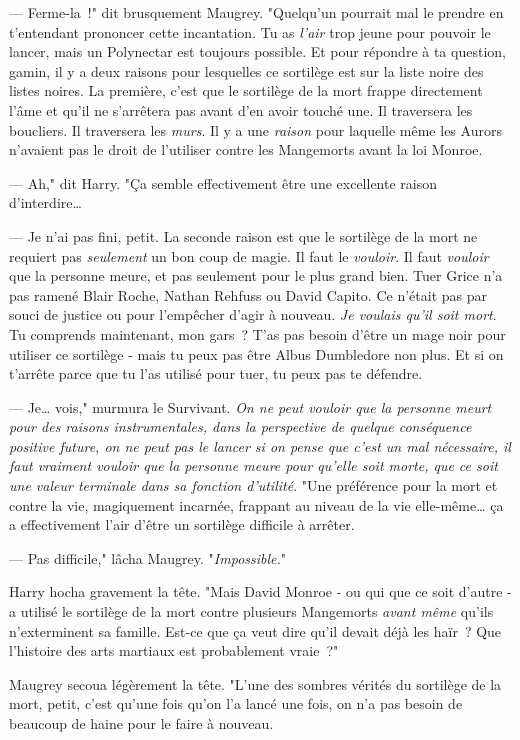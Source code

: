 --- Ferme-la~!" dit brusquement Maugrey. "Quelqu'un pourrait mal le prendre en t'entendant prononcer cette incantation. Tu as \emph{l'air} trop jeune pour pouvoir le lancer, mais un Polynectar est toujours possible. Et pour répondre à ta question, gamin, il y a deux raisons pour lesquelles ce sortilège est sur la liste noire des listes noires. La première, c'est que le sortilège de la mort frappe directement l'âme et qu'il ne s'arrêtera pas avant d'en avoir touché une. Il traversera les boucliers. Il traversera les \emph{murs}. Il y a une \emph{raison} pour laquelle même les Aurors n'avaient pas le droit de l'utiliser contre les Mangemorts avant la loi Monroe.

--- Ah," dit Harry. "Ça semble effectivement être une excellente raison d'interdire…

--- Je n'ai pas fini, petit. La seconde raison est que le sortilège de la mort ne requiert pas \emph{seulement} un bon coup de magie. Il faut le \emph{vouloir}. Il faut \emph{vouloir} que la personne meure, et pas seulement pour le plus grand bien. Tuer Grice n'a pas ramené Blair Roche, Nathan Rehfuss ou David Capito. Ce n'était pas par souci de justice ou pour l'empêcher d'agir à nouveau. \emph{Je voulais qu'il soit mort}. Tu comprends maintenant, mon gars~? T'as pas besoin d'être un mage noir pour utiliser ce sortilège - mais tu peux pas être Albus Dumbledore non plus. Et si on t'arrête parce que tu l'as utilisé pour tuer, tu peux pas te défendre.

--- Je… vois," murmura le Survivant. \emph{On ne peut vouloir que la personne meurt pour des raisons instrumentales, dans la perspective de quelque conséquence positive future, on ne peut pas le lancer si on pense que c'est un mal nécessaire, il faut vraiment vouloir que la personne meure pour qu'elle soit morte, que ce soit une valeur terminale dans sa fonction d'utilité}. "Une préférence pour la mort et contre la vie, magiquement incarnée, frappant au niveau de la vie elle-même… ça a effectivement l'air d'être un sortilège difficile à arrêter.

--- Pas difficile," lâcha Maugrey. "\emph{Impossible.}"

Harry hocha gravement la tête. "Mais David Monroe - ou qui que ce soit d'autre - a utilisé le sortilège de la mort contre plusieurs Mangemorts \emph{avant même} qu'ils n'exterminent sa famille. Est-ce que ça veut dire qu'il devait déjà les haïr~? Que l'histoire des arts martiaux est probablement vraie~?"

Maugrey secoua légèrement la tête. "L'une des sombres vérités du sortilège de la mort, petit, c'est qu'une fois qu'on l'a lancé une fois, on n'a pas besoin de beaucoup de haine pour le faire à nouveau.


